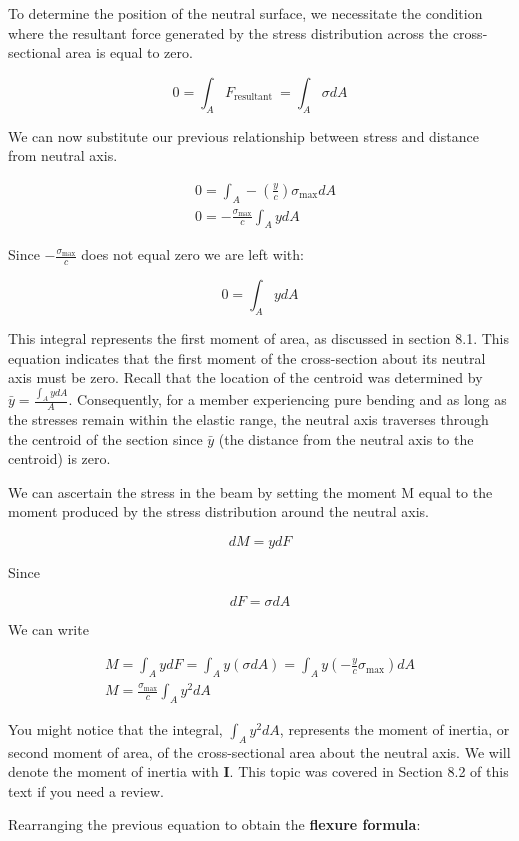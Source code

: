 \documentclass[
  letterpaper,
  DIV=11,
  numbers=noendperiod]{scrreprt}
\begin{document}
To determine the position of the neutral surface, we necessitate the
condition where the resultant force generated by the stress distribution
across the cross-sectional area is equal to zero.

\[
0=\int_A F_{\text {resultant }}=\int_A \sigma d A
\]

We can now substitute our previous relationship between stress and
distance from neutral axis.

\[
\begin{aligned}
& 0=\int_A-\left(\frac{y}{c}\right) \sigma_{\max } d A \\
& 0=-\frac{\sigma_{\max }}{c} \int_A y d A
\end{aligned}
\]

Since \(-\frac{\sigma_{\max }}{c}\) does not equal zero we are left
with:

\[
0=\int_A y d A
\]

This integral represents the first moment of area, as discussed in
section 8.1. This equation indicates that the first moment of the
cross-section about its neutral axis must be zero. Recall that the
location of the centroid was determined by
\(\bar{y}=\frac{\int_A y d A}{A}\). Consequently, for a member
experiencing pure bending and as long as the stresses remain within the
elastic range, the neutral axis traverses through the centroid of the
section since \(\bar{y}\) (the distance from the neutral axis to the
centroid) is zero.

We can ascertain the stress in the beam by setting the moment M equal to
the moment produced by the stress distribution around the neutral axis.

\[
d M=y d F
\]

Since

\[
d F=\sigma d A
\]

We can write

\[
\begin{gathered}
M=\int_A y d F=\int_A y(\sigma d A)=\int_A y\left(-\frac{y}{c} \sigma_{\max }\right) d A \\
M=\frac{\sigma_{\max }}{c} \int_A y^2 d A
\end{gathered}
\]

You might notice that the integral, \(\int_A y^2 d A\), represents the
moment of inertia, or second moment of area, of the cross-sectional area
about the neutral axis. We will denote the moment of inertia with
\textbf{I}. This topic was covered in Section 8.2 of this text if you
need a review.

Rearranging the previous equation to obtain the \textbf{flexure
formula}:
\end{document}
